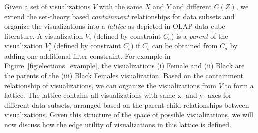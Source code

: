 \npar Given a set of visualizations $V$ with the same $X$ and $Y$ and different $C(Z)$, we extend the set-theory based \emph{containment} relationships for data subsets and organize the visualizations into a \textit{lattice} as depicted in OLAP data cube literature. A visualization $V_i$ (defined by constraint $C_a$) is a \textit{parent} of the visualization $V_i^j$ (defined by constraint $C_b$) if $C_b$ can be obtained from $C_a$ by adding one additional filter constraint. For example in Figure~\ref{fig:elections_example}, the visualizations (i) Female and (ii) Black are the parents of the (iii) Black Females visualization. Based on the containment relationship of visualizations, we can organize the visualizations from $V$ to form a lattice. The lattice contains all visualizations with same x- and y- axes for different data subsets, arranged based on the parent-child relationships between visualizations. Given this structure of the space of possible visualizations, we will now discuss how the edge utility of visualizations in this lattice is defined.


